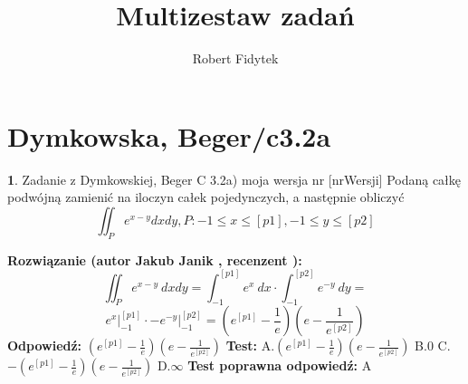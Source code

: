 \documentclass[12pt, a4paper]{article}
\title{Multizestaw zadań}
\author{Robert Fidytek}
\date{}
\theoremstyle{definition} %
\newtheorem{zad}{}
\newcommand{\kategoria}[1]{\section{#1}} %
\newcommand{\zadStart}[1]{\begin{zad}#1\newline} %
\newcommand{\zadStop}{\end{zad}}   %
\newcommand{\rozwStart}[2]{\noindent \textbf{Rozwiązanie (autor #1 , recenzent #2): }\newline} %
\newcommand{\rozwStop}{\newline}                                            %
\newcommand{\odpStart}{\noindent \textbf{Odpowiedź:}\newline}    %
\newcommand{\odpStop}{\newline}                                             %
\newcommand{\testStart}{\noindent \textbf{Test:}\newline} %
\newcommand{\testStop}{\newline} %
\newcommand{\kluczStart}{\noindent \textbf{Test poprawna odpowiedź:}\newline} %
\newcommand{\kluczStop}{\newline} %
\begin{document}
\maketitle


\kategoria{Dymkowska, Beger/c3.2a}
\zadStart{Zadanie z Dymkowskiej, Beger C 3.2a) moja wersja nr [nrWersji]}
Podaną całkę podwójną zamienić na iloczyn całek pojedynczych, a następnie obliczyć $$\iint_P e^{x-y} dxdy, P: -1\leq x \leq [p1], -1 \leq y \leq [p2]$$
\zadStop
\rozwStart{Jakub Janik}{}
$$\iint_P e^{x-y}\ dxdy=\int_{-1}^{[p1]}e^x\ dx\cdot \int_{-1}^{[p2]}e^{-y}\ dy=$$
$$e^x\Big|_{-1}^{[p1]}\cdot -e^{-y}\Big|_{-1}^{[p2]}=(e^{[p1]}-\frac{1}{e})(e-\frac{1}{e^{[p2]}})$$
\rozwStop
\odpStart
$(e^{[p1]}-\frac{1}{e})(e-\frac{1}{e^{[p2]}})$
\odpStop
\testStart
A.$(e^{[p1]}-\frac{1}{e})(e-\frac{1}{e^{[p2]}})$
B.$0$
C.$-(e^{[p1]}-\frac{1}{e})(e-\frac{1}{e^{[p2]}})$
D.$\infty$
\testStop
\kluczStart
A
\kluczStop
\end{document}
